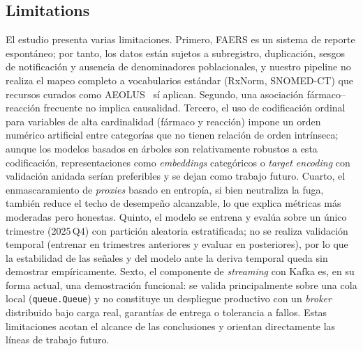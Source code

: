 \documentclass[12pt,a4paper]{article}
\begin{document}
\subsection{Limitations}
El estudio presenta varias limitaciones. Primero, FAERS es un sistema de reporte espontáneo; por tanto, los datos están sujetos a subregistro, duplicación, sesgos de notificación y ausencia de denominadores poblacionales, y nuestro pipeline no realiza el mapeo completo a vocabularios estándar (RxNorm, SNOMED-CT) que recursos curados como AEOLUS~\cite{banda2016} sí aplican. Segundo, una asociación fármaco--reacción frecuente no implica causalidad. Tercero, el uso de codificación ordinal para variables de alta cardinalidad (fármaco y reacción) impone un orden numérico artificial entre categorías que no tienen relación de orden intrínseca; aunque los modelos basados en árboles son relativamente robustos a esta codificación, representaciones como \textit{embeddings} categóricos o \textit{target encoding} con validación anidada serían preferibles y se dejan como trabajo futuro. Cuarto, el enmascaramiento de \textit{proxies} basado en entropía, si bien neutraliza la fuga, también reduce el techo de desempeño alcanzable, lo que explica métricas más moderadas pero honestas. Quinto, el modelo se entrena y evalúa sobre un único trimestre (2025\,Q4) con partición aleatoria estratificada; no se realiza validación temporal (entrenar en trimestres anteriores y evaluar en posteriores), por lo que la estabilidad de las señales y del modelo ante la deriva temporal queda sin demostrar empíricamente. Sexto, el componente de \textit{streaming} con Kafka es, en su forma actual, una demostración funcional: se valida principalmente sobre una cola local (\texttt{queue.Queue}) y no constituye un despliegue productivo con un \textit{broker} distribuido bajo carga real, garantías de entrega o tolerancia a fallos. Estas limitaciones acotan el alcance de las conclusiones y orientan directamente las líneas de trabajo futuro.
\end{document}
